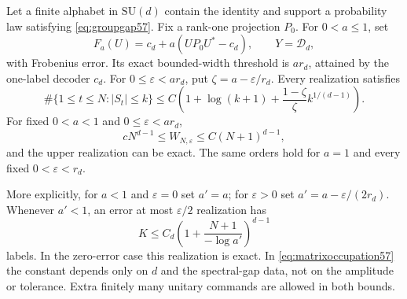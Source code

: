 \begin{theorem}\label{thm:matrixwidth57}
Let a finite alphabet in $\mathrm{SU}(d)$ contain the identity and support a probability law satisfying \eqref{eq:groupgap57}. Fix a rank-one projection $P_0$. For $0<a\le1$, set
\begin{equation}\label{eq:matrixexperiment57}
 F_a(U)=c_d+a(UP_0U^*-c_d),\qquad Y=\mathcal D_d,
\end{equation}
with Frobenius error. Its exact bounded-width threshold is $a r_d$, attained by the one-label decoder $c_d$. For $0\le\varepsilon<a r_d$, put $\zeta=a-\varepsilon/r_d$. Every realization satisfies
\begin{equation}\label{eq:matrixoccupation57}
 \#\{1\le t\le N:|S_t|\le k\}
 \le C\left(1+\log(k+1)+\frac{1-\zeta}{\zeta}k^{1/(d-1)}\right).
\end{equation}
For fixed $0<a<1$ and $0\le\varepsilon<a r_d$,
\begin{equation}\label{eq:matrixrate57}
 cN^{d-1}
            \le W_{N,\varepsilon}\le C(N+1)^{d-1},
\end{equation}
and the upper realization can be exact. The same orders hold for $a=1$ and every fixed $0<\varepsilon<r_d$.

More explicitly, for $a<1$ and $\varepsilon=0$ set $a'=a$; for $\varepsilon>0$ set $a'=a-\varepsilon/(2r_d)$. Whenever $a'<1$, an error at most $\varepsilon/2$ realization has
\begin{equation}\label{eq:matrixupper57}
 K\le C_d\left(1+\frac{N+1}{-\log a'}\right)^{d-1}
\end{equation}
labels. In the zero-error case this realization is exact. In \eqref{eq:matrixoccupation57} the constant depends only on $d$ and the spectral-gap data, not on the amplitude or tolerance. Extra finitely many unitary commands are allowed in both bounds.
\end{theorem}
